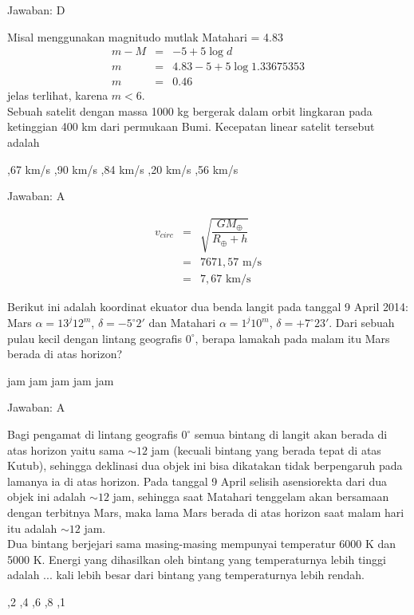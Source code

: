 \documentclass[11pt,fleqn]{exam}
\begin{document}
\begin{questions}
Jawaban: D

Misal menggunakan magnitudo mutlak Matahari = 4.83
\begin{eqnarray*}
m - M &=& -5 + 5 \log d \\
m &=& 4.83 - 5 + 5 \log 1.33675353\\
m &=& 0.46  
\end{eqnarray*}
jelas terlihat, karena $m < 6$.\\


\question Sebuah satelit dengan massa 1000 kg bergerak dalam orbit lingkaran pada ketinggian 400 km dari permukaan Bumi. Kecepatan linear satelit tersebut adalah
\begin{choices}
,67 km/s
,90 km/s
,84 km/s
,20 km/s
,56 km/s
\end{choices}

Jawaban: A

\begin{eqnarray*}
v_{circ}&=&\sqrt{\dfrac{GM_{\oplus}}{R_{\oplus}+h}}\\
&=&7671,57 \text{  m/s}\\
&=&7,67 \text{  km/s}
\end{eqnarray*}


\question Berikut ini adalah koordinat ekuator dua benda langit pada tanggal 9 April 2014: Mars $\alpha = 13^{j}12^{m}$, $\delta = -5^{\circ}2'$ dan Matahari $\alpha = 1^{j}10^{m}$, $\delta = +7^{\circ}23'$. Dari sebuah pulau kecil dengan lintang geografis $0^{\circ}$, berapa lamakah pada malam itu Mars berada di atas horizon?
\begin{choices}
 jam
 jam
 jam
 jam
 jam
\end{choices}

Jawaban: A

Bagi pengamat di lintang geografis $0^{\circ}$ semua bintang di langit akan berada di atas horizon yaitu sama $\sim 12$ jam (kecuali bintang yang berada tepat di atas Kutub), sehingga deklinasi dua objek ini bisa dikatakan tidak berpengaruh pada lamanya ia di atas horizon. Pada tanggal 9 April selisih asensiorekta dari dua objek ini adalah $\sim 12$ jam, sehingga saat Matahari tenggelam akan bersamaan dengan terbitnya Mars, maka lama Mars berada di atas horizon saat malam hari itu adalah $\sim 12$ jam.\\


\question Dua bintang berjejari sama masing-masing mempunyai temperatur 6000 K dan 5000 K. Energi yang dihasilkan oleh bintang yang temperaturnya lebih tinggi adalah ... kali lebih besar dari bintang yang temperaturnya lebih rendah.
\begin{choices}
,2
,4
,6
,8
,1
\end{choices}


\end{questions}
\end{document}
